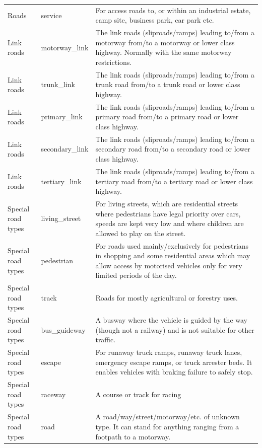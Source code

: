 \documentclass[abstract=off,10pt,a4paper,bibliography=totocnumbered]{article}
\begin{document}
\begin{table}[hbtp]
\begin{center}
{\begin{tabular}{llp{12cm}}
      Roads &
        service &
          For access roads to, or within an industrial estate, camp site,
          business park, car park etc. \\
      \rowcolor[gray]{0.90}
      Link roads &
        motorway\_link &
          The link roads (sliproads/ramps) leading to/from a motorway from/to
          a motorway or lower class highway. Normally with the same motorway
          restrictions. \\
      \rowcolor[gray]{0.90}
      Link roads &
        trunk\_link &
          The link roads (sliproads/ramps) leading to/from a trunk road
          from/to a trunk road or lower class highway. \\
      \rowcolor[gray]{0.90}
      Link roads &
        primary\_link &
          The link roads (sliproads/ramps) leading to/from a primary road
          from/to a primary road or lower class highway. \\
      \rowcolor[gray]{0.90}
      Link roads &
        secondary\_link &
          The link roads (sliproads/ramps) leading to/from a secondary road
          from/to a secondary road or lower class highway. \\
      Link roads &
        tertiary\_link &
          The link roads (sliproads/ramps) leading to/from a tertiary road
          from/to a tertiary road or lower class highway. \\
      Special road types &
        living\_street &
          For living streets, which are residential streets where pedestrians
          have legal priority over cars, speeds are kept very low and where
          children are allowed to play on the street. \\
      Special road types &
        pedestrian &
          For roads used mainly/exclusively for pedestrians in shopping and
          some residential areas which may allow access by motorised vehicles
          only for very limited periods of the day. \\
      Special road types &
        track &
          Roads for mostly agricultural or forestry uses. \\
      Special road types &
        bus\_guideway &
          A busway where the vehicle is guided by the way (though not a railway)
          and is not suitable for other traffic. \\
      Special road types &
        escape &
          For runaway truck ramps, runaway truck lanes, emergency escape
          ramps, or truck arrester beds. It enables vehicles with braking
          failure to safely stop. \\
      Special road types &
        raceway &
          A course or track for racing \\
      Special road types &
        road &
          A road/way/street/motorway/etc. of unknown type. It can stand for
          anything ranging from a footpath to a motorway. \\
      \bottomrule
      \end{tabular}
    }
  \end{center}
\end{table}
\end{document}
